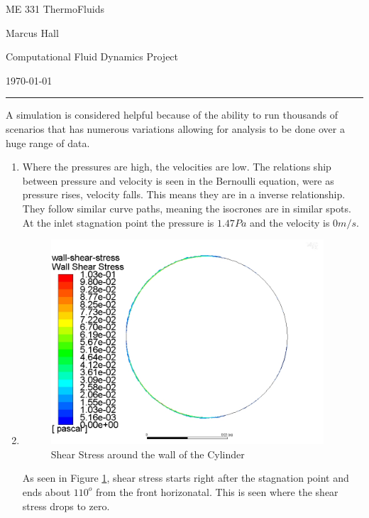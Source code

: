 \documentclass[11pt]{article}
\begin{document}
ME 331 ThermoFluids

Marcus Hall

Computational Fluid Dynamics Project

\today

\medskip\hrule\medskip

A simulation is considered helpful because of the ability to run thousands of
scenarios that has numerous variations allowing for analysis to be done over a huge
range of data.

\begin{enumerate}
\item Where the pressures are high, the velocities are low. The relations ship
between pressure and velocity is seen in the Bernoulli equation, were as pressure
rises, velocity falls. This means they are in a inverse relationship. They follow
similar curve paths, meaning the isocrones are in similar spots. At the inlet
stagnation point the pressure is $1.47 \si{Pa}$ and the velocity is $0 \si{m/s}$. 

\item 
\begin{figure}[H]
\centering
\includegraphics[width=4in]{wall-shear-stress2.jpg}
\caption{Shear Stress around the wall of the Cylinder}
\label{fig:shear}
\end{figure}
As seen in Figure \ref{fig:shear}, shear stress starts right after the
stagnation point and ends about $110^o$ from the front horizonatal. This is seen
where the shear stress drops to zero.



\end{enumerate}
\end{document}
